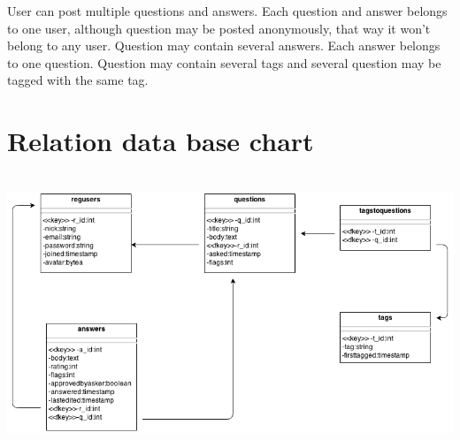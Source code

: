 \documentclass[a4paper,12pt]{article}
\begin{document}
User can post multiple questions and answers. Each question and answer belongs to one user, although question may be posted anonymously, that way it won't belong to any user. Question may contain several answers. Each answer belongs to one question. Question may contain several tags and several question may be tagged with the same tag.
\newpage

\section{Relation data base chart}
\hspace*{\fill}\\
\includegraphics[scale=0.5]{RelationalDBChart}
\newpage
\end{document}

